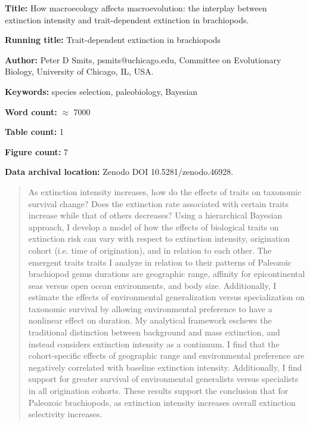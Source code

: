 \documentclass{article}
\begin{document}
\linenumbers
\modulolinenumbers[2]


\begin{titlepage}
  \begin{large}
    \textbf{Title:} How macroecology affects macroevolution: the interplay between extinction intensity and trait-dependent extinction in brachiopods.
  \end{large}

  \textbf{Running title:} Trait-dependent extinction in brachiopods

  \textbf{Author:} Peter D Smits, psmits@uchicago.edu, Committee on Evolutionary Biology, University of Chicago, IL, USA.

  \textbf{Keywords:} species selection, paleobiology, Bayesian

  \textbf{Word count:} \(\approx\) 7000
  
  \textbf{Table count:} 1
 
  \textbf{Figure count:} 7

  \textbf{Data archival location:} Zenodo DOI 10.5281/zenodo.46928.

\end{titlepage}

\begin{abstract}
  As extinction intensity increases, how do the effects of traits on taxonomic survival change? Does the extinction rate associated with certain traits increase while that of others decreases? Using a hierarchical Bayesian approach, I develop a model of how the effects of biological traits on extinction risk can vary with respect to extinction intensity, origination cohort (i.e. time of origination), and in relation to each other. The emergent traits traits I analyze in relation to their patterns of Paleozoic brachiopod genus durations are geographic range, affinity for epicontinental seas versus open ocean environments, and body size. Additionally, I estimate the effects of environmental generalization versus specialization on taxonomic survival by allowing environmental preference to have a nonlinear effect on duration. My analytical framework eschews the traditional distinction between background and mass extinction, and instead considers extinction intensity as a continuum. I find that the cohort-specific effects of geographic range and environmental preference are negatively correlated with baseline extinction intensity. Additionally, I find support for greater survival of environmental generalists versus specialists in all origination cohorts. These results support the conclusion that for Paleozoic brachiopods, as extinction intensity increases overall extinction selectivity increases.
\end{abstract}
\end{document}
